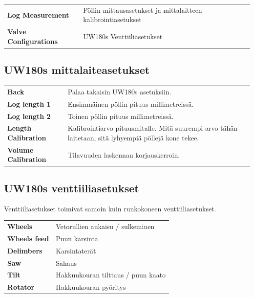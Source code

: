 \documentclass[12pt,a4paper,finnish]{uvmanual}
\begin{document}

\begin{tabular}{ L{0.2\textwidth} L{0.66\textwidth} }
\textbf{Log Measurement} & Pöllin mittausasetukset ja mittalaitteen kalibrointiasetukset\\
\textbf{Valve Configurations} & UW180s Venttiiliasetukset 
\end{tabular}

\FloatBarrier
\subsection{UW180s mittalaiteasetukset}\label{ch:settings_uw180s_meas}


\begin{tabular}{ L{0.2\textwidth} L{0.66\textwidth} }
\textbf{Back} & Palaa takaisin UW180s asetuksiin. \\
\textbf{Log length 1} & Ensimmäinen pöllin pituus millimetreissä. \\
\textbf{Log length 2} & Toinen pöllin pituus millimetreissä. \\
\textbf{Length Calibration} & Kalibrointiarvo pituusmitalle. Mitä suurempi arvo tähän laitetaan, sitä lyhyempiä pöllejä kone tekee. \\
\textbf{Volume Calibration} & Tilavuuden laskennan korjauskerroin. \\
\end{tabular}

\FloatBarrier
\subsection{UW180s venttiiliasetukset}\label{ch:settings_uw180s_valves}

Venttiiliasetukset toimivat samoin kuin runkokoneen venttiiliasetukset.


\begin{tabular}{ L{0.2\textwidth} L{0.66\textwidth} }
\textbf{Wheels} & Vetorullien aukaisu / sulkeminen \\
\textbf{Wheels feed} & Puun karsinta \\
\textbf{Delimbers} & Karsintaterät \\
\textbf{Saw} & Sahaus \\
\textbf{Tilt} & Hakkuukouran tilttaus / puun kaato \\
\textbf{Rotator} & Hakkuukouran pyöritys \\
\end{tabular}
\end{document}
